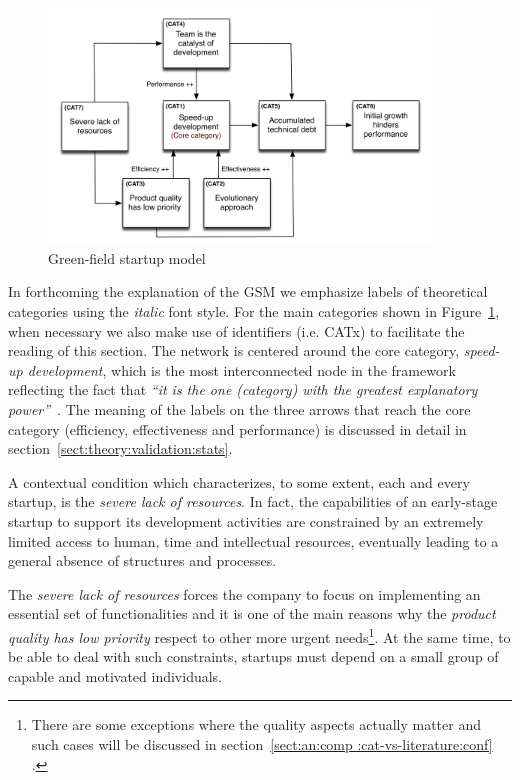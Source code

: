 \documentclass[10pt,journal,letterpaper,compsoc]{IEEEtran}
\begin{document}
\begin{figure}[!t] 
\centering 
  \includegraphics[width=4in]{figures/high-level}
  \caption{Green-field startup model}\label{fig:gsm}
\end{figure}

In forthcoming the explanation of the GSM we emphasize labels of theoretical
categories using the \textit{italic} font style. For the main categories shown
in Figure~\ref{fig:gsm}, when necessary we also make use of identifiers (i.e.
CATx) to facilitate the reading of this section. The network is centered around
the core category, \textit{speed-up development}, which is the most
interconnected node in the framework reflecting the fact that \textit{``it is
the one (category) with the greatest explanatory power''}~\cite{Strauss1998}.
The meaning of the labels on the three arrows that reach the core category
(efficiency, effectiveness and performance) is discussed in detail in 
section~\ref{sect:theory:validation:stats}. 

A contextual condition which characterizes, to some extent, each and every
startup, is the \textit{severe lack of resources}. In fact, the capabilities of
an early-stage startup to support its development activities are constrained by
an extremely limited access to human, time and intellectual resources,
eventually leading to a general absence of structures and processes.

The \textit{severe lack of resources} forces the company to focus on
implementing an essential set of functionalities and it is one of the main
reasons why the \textit{product quality has low priority} respect to other more
urgent needs\footnote{There are some exceptions where the quality aspects
actually matter and such cases will be discussed in section~\ref{sect:an:comp
:cat-vs-literature:conf}
.}. At the same time, to be able to deal with such constraints, startups must 
depend on a small group of capable and motivated individuals.
\end{document}
